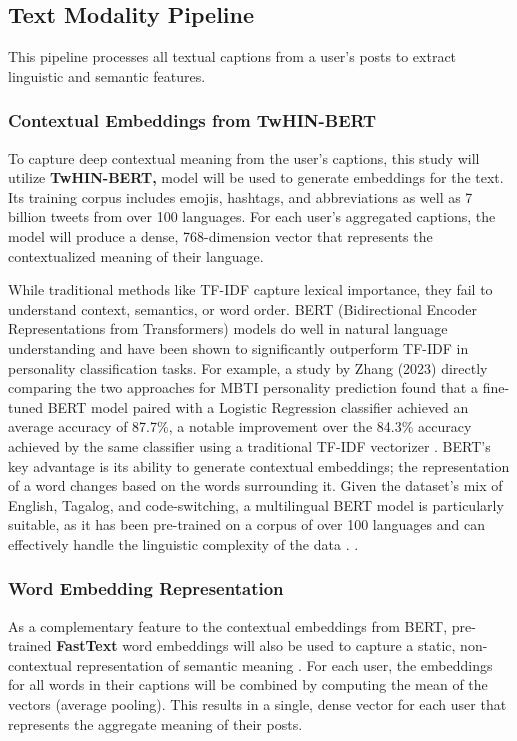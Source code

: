 \subsection{Text Modality Pipeline}
This pipeline processes all textual captions from a user's posts to extract linguistic and semantic features.

\subsubsection{Contextual Embeddings from TwHIN-BERT}
To capture deep contextual meaning from the user's captions, this study will utilize \textbf{TwHIN-BERT,} model will be used to generate embeddings for the text. Its training corpus includes emojis, hashtags, and abbreviations as well as 7 billion tweets from over 100 languages. For each user's aggregated captions, the model will produce a dense, 768-dimension vector that represents the contextualized meaning of their language.

While traditional methods like TF-IDF capture lexical importance, they fail to understand context, semantics, or word order. BERT (Bidirectional Encoder Representations from Transformers) models do well in natural language understanding and have been shown to significantly outperform TF-IDF in personality classification tasks. For example, a study by Zhang (2023) directly comparing the two approaches for MBTI personality prediction found that a fine-tuned BERT model paired with a Logistic Regression classifier achieved an average accuracy of 87.7\%, a notable improvement over the 84.3\% accuracy achieved by the same classifier using a traditional TF-IDF vectorizer \citep{zhang2023}. BERT's key advantage is its ability to generate contextual embeddings; the representation of a word changes based on the words surrounding it. Given the dataset's mix of English, Tagalog, and code-switching, a multilingual BERT model is particularly suitable, as it has been pre-trained on a corpus of over 100 languages and can effectively handle the linguistic complexity of the data \citep{devlin2018bert, cruz2022roberta}. .

\subsubsection{Word Embedding Representation}
As a complementary feature to the contextual embeddings from BERT, pre-trained \textbf{FastText} word embeddings will also be used to capture a static, non-contextual representation of semantic meaning \citep{grave2018}. For each user, the embeddings for all words in their captions will be combined by computing the mean of the vectors (average pooling). This results in a single, dense vector for each user that represents the aggregate meaning of their posts.

